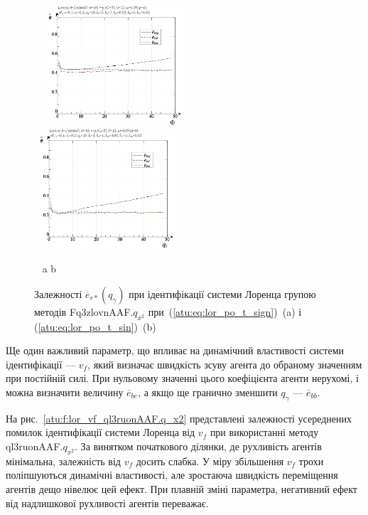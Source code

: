 \begin{figure}[ht!]
  \begin{center}
    ~ \hfill
    \includegraphics[width=0.49\textwidth]{p/cha/lor/Fq3zlovnAAF/lor_Fq3zlovnAAF_qx2-p_qg_e_sign.png}
    \hfill
    \includegraphics[width=0.49\textwidth]{p/cha/lor/Fq3zlovnAAF/lor_Fq3zlovnAAF_qx2-p_qg_e_sin.png}
    \hfill ~
  \end{center}
  \vspace{-1.0ex}
  \begin{center}
    ~ \hfill a \hfill\hfill b \hfill ~
  \end{center}
  \vspace{-1.5ex}
  \caption{Залежності $ \overline{e}_{r *} (q_\gamma) $ при ідентифікації системи Лоренца групою методів Fq3zlovnAAF.$q_{x^2} $ при~(\ref{atu:eq:lor_po_t_sign})~(a) і (\ref{atu:eq:lor_po_t_sin})~(b)}
\label{atu:f:lor_qg_Fq3zlovnAAF.q_x2}
\end{figure}


Ще один важливий параметр, що впливає на динамічний властивості
системи ідентифікації ---
$ v_f $, який визначає швидкість зсуву агента до обраному значенням
при постійній силі. При нульовому значенні цього коефіцієнта
агенти нерухомі, і можна визначити величину
$ \overline{e}_{be} $, а якщо ще гранично зменшити
$ q_\gamma $ ---
$ \overline{e}_{bb} $.



На рис.~\ref{atu:f:lor_vf_ql3ruonAAF.q_x2} представлені залежності усереднених
помилок ідентифікації системи Лоренца від
$ v_f $ при використанні методу
ql3ruonAAF.$q_{x^2}$.
За винятком початкового ділянки, де рухливість агентів
мінімальна, залежність від
$ v_f $ досить слабка. У міру збільшення
$ v_f $ трохи поліпшуються динамічні властивості, але зростаюча
швидкість переміщення агентів дещо нівелює цей ефект. При
плавній зміні параметра, негативний ефект від надлишкової
рухливості агентів переважає.

